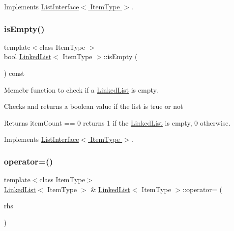 Implements \hyperlink{classListInterface_a5b2f86954a86172699a3495982c38e77}{List\+Interface$<$ Item\+Type $>$}.

\mbox{\label{classLinkedList_a008e916c3d51d28b4cc9c8cdf3e9d921}} 
\subsubsection{\texorpdfstring{is\+Empty()}{isEmpty()}}
{\footnotesize\ttfamily template$<$class Item\+Type $>$ \\
bool \hyperlink{classLinkedList}{Linked\+List}$<$ Item\+Type $>$\+::is\+Empty (\begin{DoxyParamCaption}{ }\end{DoxyParamCaption}) const\hspace{0.3cm}{\ttfamily [virtual]}}



Memebr function to check if a \hyperlink{classLinkedList}{Linked\+List} is empty. 

Checks and returns a boolean value if the list is true or not \begin{DoxyReturn}{Returns}
item\+Count == 0 returns 1 if the \hyperlink{classLinkedList}{Linked\+List} is empty, 0 otherwise. 
\end{DoxyReturn}


Implements \hyperlink{classListInterface_a924f91e7f81d7dcd3fda79bbcc671394}{List\+Interface$<$ Item\+Type $>$}.

\mbox{\label{classLinkedList_a25b0fba69e66b0fa409be992530029bc}} 
\subsubsection{\texorpdfstring{operator=()}{operator=()}}
{\footnotesize\ttfamily template$<$class Item\+Type$>$ \\
\hyperlink{classLinkedList}{Linked\+List}$<$ Item\+Type $>$ \& \hyperlink{classLinkedList}{Linked\+List}$<$ Item\+Type $>$\+::operator= (\begin{DoxyParamCaption}\item[{const \hyperlink{classLinkedList}{Linked\+List}$<$ Item\+Type $>$ \&}]{rhs }\end{DoxyParamCaption})}



